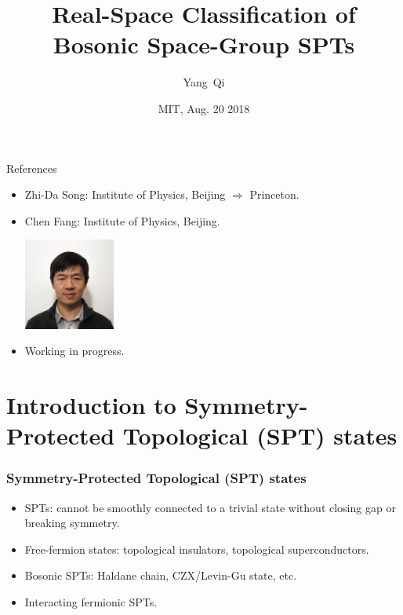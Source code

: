 \documentclass[xcolor=table, 10pt, aspectratio=43]{beamer}
\title[Space-group SPTs] %
{Real-Space Classification of Bosonic Space-Group SPTs}
\author[Y Qi] %
{Yang~Qi}
\institute[Fudan] %
{Department of Physics, Fudan University}
\date{MIT, Aug. 20 2018}
\begin{document}
\begin{frame}
  \titlepage
\end{frame}

\begin{frame}{References}
\begin{itemize}
\item Zhi-Da Song: Institute of Physics, Beijing $\Rightarrow$ Princeton.
\item Chen Fang: Institute of Physics, Beijing.
\begin{center}
	\includegraphics[height=3cm]{../people/chenfang}
\end{center}
\item Working in progress.
\end{itemize}
\end{frame}

\section{Introduction to Symmetry-Protected Topological (SPT) states}

\begin{frame}
  \frametitle{Symmetry-Protected Topological (SPT) states}
\begin{itemize}
\item SPTs: cannot be smoothly connected to a trivial state without closing gap or breaking symmetry.
\item Free-fermion states: topological insulators, topological superconductors.
\item Bosonic SPTs: Haldane chain, CZX/Levin-Gu state, etc.
\item Interacting fermionic SPTs.
\end{itemize}
\end{frame}
\end{document}
